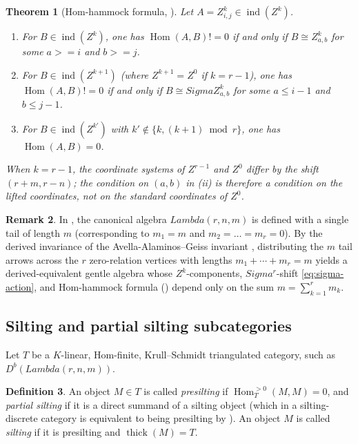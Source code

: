 \documentclass[11pt, a4paper]{article}
\newtheorem{theorem}{Theorem}[section]
\theoremstyle{definition}
\newtheorem{definition}[theorem]{Definition}
\newtheorem{remark}[theorem]{Remark}
\def\Lambda{Lambda}%
\def\Sigma{Sigma}%
\def\ss{ss}%
\def\ge{>=}%
\def\neq{!=}%
\def\mathcal#1{#1}%
\def\Db{D^b}%
\newcommand{\Db}{\mathcal{D}^b}
\begin{document}
\begin{theorem}[Hom-hammock formula, {\cite[Section~2]{BGS2004}}]\label{thm:hammock}
Let $A=Z_{i,j}^k\in\operatorname{ind}(\mathcal Z^k)$.
\begin{enumerate}[label=\textup{(\roman*)}]
\item For $B\in\operatorname{ind}(\mathcal Z^k)$, one has $\operatorname{Hom}(A,B)\neq 0$ if and only if $B\cong Z_{a,b}^k$ for some $a\ge i$ and $b\ge j$.
\item For $B\in\operatorname{ind}(\mathcal Z^{k+1})$ (where $\mathcal Z^{k+1}=\mathcal Z^0$ if $k=r-1$), one has $\operatorname{Hom}(A,B)\neq 0$ if and only if $B\cong \Sigma Z_{a,b}^k$ for some $a\le i-1$ and $b\le j-1$.
\item For $B\in\operatorname{ind}(\mathcal Z^{k'})$ with $k'\notin\{k,(k+1)\bmod r\}$, one has $\operatorname{Hom}(A,B)=0$.
\end{enumerate}
When $k = r-1$, the coordinate systems of $\mathcal{Z}^{r-1}$ and $\mathcal{Z}^0$ differ by the shift $(r+m, r-n)$; the condition on $(a,b)$ in \textup{(ii)} is therefore a condition on the lifted coordinates, not on the standard coordinates of $\mathcal{Z}^0$.
\end{theorem}

\begin{remark}\label{rem:hammock-arbitrary-tails}
In \cite{BGS2004}, the canonical algebra $\Lambda(r,n,m)$ is defined with a single tail of length $m$ (corresponding to $m_1 = m$ and $m_2 = \dots = m_r = 0$). By the derived invariance of the Avella-Alaminos--Gei\ss{} invariant \cite{AAG2008}, distributing the $m$ tail arrows across the $r$ zero-relation vertices with lengths $m_1 + \cdots + m_r = m$ yields a derived-equivalent gentle algebra whose $\mathcal{Z}^k$-components, $\Sigma^r$-shift \eqref{eq:sigma-action}, and Hom-hammock formula () depend only on the sum $m = \sum_{k=1}^r m_k$.
\end{remark}

\subsection{Silting and partial silting subcategories}
\label{subsec:prelim-silting}

Let $\mathcal{T}$ be a $K$-linear, Hom-finite, Krull--Schmidt triangulated category, such as $\Db(\Lambda(r,n,m))$.

\begin{definition}\label{def:silting}
An object $M \in \mathcal{T}$ is called \emph{presilting} if $\operatorname{Hom}_{\mathcal{T}}^{>0}(M, M) = 0$, and \emph{partial silting} if it is a direct summand of a silting object (which in a silting-discrete category is equivalent to being presilting by ). An object $M$ is called \emph{silting} if it is presilting and $\operatorname{thick}(M) = \mathcal{T}$.
\end{definition}
\end{document}

